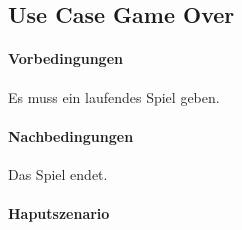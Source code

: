 \documentclass[a4paper, twosided, 11pt]{scrartcl}
\begin{document}
\subsection{Use Case Game Over}
\paragraph{Vorbedingungen} Es muss ein laufendes Spiel geben.
\paragraph{Nachbedingungen} Das Spiel endet.
\paragraph{Haputszenario}
\end{document}
